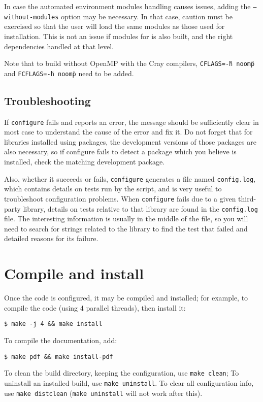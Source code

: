 \documentclass[a4paper,10pt,twoside]{csshortdoc}
\begin{document}
In case the automated environment modules handling causes issues,
adding the \texttt{--without-modules} option may be necessary.
In that case, caution must be exercised so that the user will load
the same modules as those used for installation. This is not an issue
if modules for \CS is also built, and the right dependencies
handled at that level.

Note that to build without OpenMP with the Cray compilers,
\texttt{CFLAGS=\"-h noomp\"} and \texttt{FCFLAGS=\"-h noomp\"}
need to be added.

\subsection{Troubleshooting\label{sec:config:troubleshoot}}

If \texttt{configure} fails and reports an error, the message should
be sufficiently clear in most case to understand the cause of the
error and fix it. Do not forget that for libraries installed using
packages, the development versions of those packages are also
necessary, so if configure fails to detect a package which you
believe is installed, check the matching development package.

Also, whether it succeeds or fails, \texttt{configure} generates
a file named \texttt{config.log}, which contains details on tests
run by the script, and is very useful to troubleshoot
configuration problems. When \texttt{configure} fails due to a given
third-party library, details on tests relative to that library
are found in the \texttt{config.log} file. The interesting information
is usually in the middle of the file, so you will need to search
for strings related to the library to find the test that failed
and detailed reasons for its failure.

\section{Compile and install\label{sec:compile}}

Once the code is configured, it may be compiled and installed;
for example, to compile the code (using 4 parallel threads),
then install it:

\texttt{\$ make -j 4 \&\& make install}

To compile the documentation, add:

\texttt{\$ make pdf \&\& make install-pdf}

To clean the build directory, keeping the configuration,
use \texttt{make clean};
To uninstall an installed build, use \texttt{make uninstall}.
To clear all configuration info, use \texttt{make distclean}
(\texttt{make uninstall} will not work after this).
\end{document}
